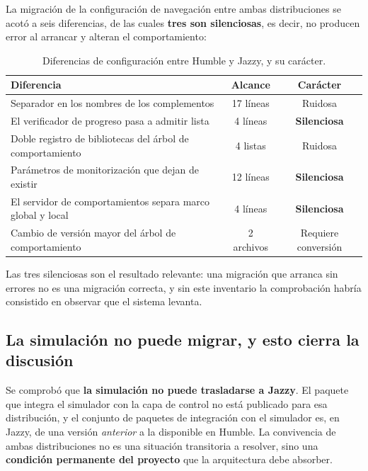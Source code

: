 \documentclass[12pt,letterpaper]{article}
\begin{document}
La migración de la configuración de navegación entre ambas distribuciones se acotó a seis diferencias, de las cuales \textbf{tres son silenciosas}, es decir, no producen error al arrancar y alteran el comportamiento:

\begin{table}[H]
    \centering
    \small
    \caption{Diferencias de configuración entre Humble y Jazzy, y su carácter.}
    \label{tab:diferencias}
    \begin{tabular}{@{}p{7.2cm}cc@{}}
        \toprule
        \textbf{Diferencia} & \textbf{Alcance} & \textbf{Carácter} \\ \midrule
        Separador en los nombres de los complementos & 17 líneas & Ruidosa \\ \addlinespace
        El verificador de progreso pasa a admitir lista & 4 líneas & \textbf{Silenciosa} \\ \addlinespace
        Doble registro de bibliotecas del árbol de comportamiento & 4 listas & Ruidosa \\ \addlinespace
        Parámetros de monitorización que dejan de existir & 12 líneas & \textbf{Silenciosa} \\ \addlinespace
        El servidor de comportamientos separa marco global y local & 4 líneas & \textbf{Silenciosa} \\ \addlinespace
        Cambio de versión mayor del árbol de comportamiento & 2 archivos & Requiere conversión \\ \bottomrule
    \end{tabular}
\end{table}

Las tres silenciosas son el resultado relevante: una migración que arranca sin errores no es una migración correcta, y sin este inventario la comprobación habría consistido en observar que el sistema levanta.

\subsection{La simulación no puede migrar, y esto cierra la discusión}

Se comprobó que \textbf{la simulación no puede trasladarse a Jazzy}. El paquete que integra el simulador con la capa de control no está publicado para esa distribución, y el conjunto de paquetes de integración con el simulador es, en Jazzy, de una versión \emph{anterior} a la disponible en Humble. La convivencia de ambas distribuciones no es una situación transitoria a resolver, sino una \textbf{condición permanente del proyecto} que la arquitectura debe absorber.
\end{document}
